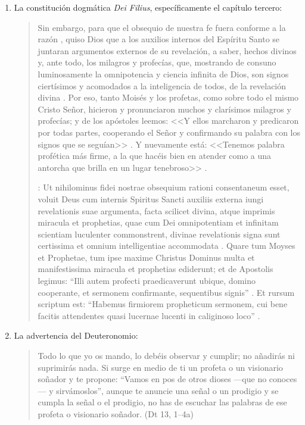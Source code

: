 \begin{enumerate}
\item La constitución dogmática \emph{Dei Filius}, específicamente el capítulo tercero: \blockquote[{\cite[\S\,3009]{vati1870df}}: Ut nihilominus fidei nostrae obsequium rationi consentaneum  esset, voluit Deus cum internis Spiritus Sancti auxiliis externa iungi revelationis suae argumenta, facta scilicet divina, atque imprimis miracula et prophetias, quae cum Dei omnipotentiam et infinitam scientiam luculenter commonstrent, divinae revelationis signa sunt certissima et omnium intelligentiae accommodata . Quare tum Moyses et Prophetae, tum ipse maxime Christus Dominus multa et manifestissima miracula et prophetias ediderunt; et de Apostolis legimus: ``Illi autem profecti praedicaverunt ubique, domino cooperante, et sermonem confirmante, sequentibus signis'' . Et rursum scriptum est: ``Habemus firmiorem propheticum sermonem, cui bene facitis attendentes quasi lucernae lucenti in caliginoso loco'' .]{Sin embargo, para que el obsequio de nuestra fe fuera conforme a la razón , quiso Dios que a los auxilios internos del Espíritu Santo se juntaran argumentos externos de su revelación, a saber, hechos divinos y, ante todo, los milagros y profecías, que, mostrando de consuno luminosamente la omnipotencia y ciencia infinita de Dios, son signos ciertísimos y acomodados a la inteligencia de todos, de la revelación divina . Por eso, tanto Moisés y los profetas, como sobre todo el mismo Cristo Señor, hicieron y pronunciaron muchos y clarísimos milagros y profecías; y de los apóstoles leemos: <<Y ellos marcharon y predicaron por todas partes, cooperando el Señor y confirmando su palabra con los signos que se seguían>> . Y nuevamente está: <<Tenemos palabra profética más firme, a la que hacéis bien en atender como a una antorcha que brilla en un lugar tenebroso>> .}
\item La advertencia del Deuteronomio: \blockquote{Todo lo que yo os mando, lo
    debéis observar y cumplir; no añadirás ni suprimirás nada. Si surge en medio
    de ti un profeta o un visionario soñador y te propone: \enquote{Vamos en pos
      de otros dioses ---que no conoces--- y sirvámoslos}, aunque te anuncie una
    señal o un prodigio y se cumpla la señal o el prodigio, no has de escuchar
    las palabras de ese profeta o visionario soñador. (Dt 13, 1--4a)}

\end{enumerate}
